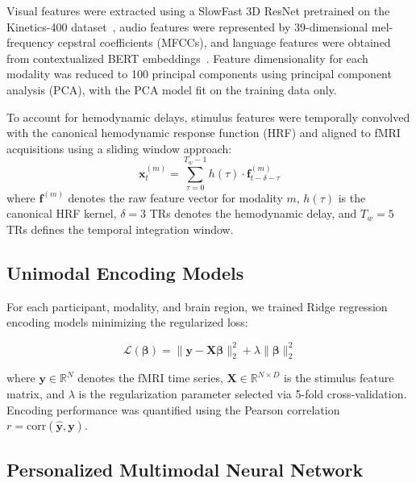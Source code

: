 \documentclass[10pt,letterpaper]{article}
\begin{document}
Visual features were extracted using a SlowFast 3D ResNet pretrained on the Kinetics-400 dataset~\citep{feichtenhofer2019slowfast}, audio features were represented by 39-dimensional mel-frequency cepstral coefficients (MFCCs), and language features were obtained from contextualized BERT embeddings~\citep{devlin2019bert}. Feature dimensionality for each modality was reduced to 100 principal components using principal component analysis (PCA), with the PCA model fit on the training data only.

To account for hemodynamic delays, stimulus features were temporally convolved with the canonical hemodynamic response function (HRF) and aligned to fMRI acquisitions using a sliding window approach:
\begin{equation}\label{eq:xt}
\mathbf{x}_t^{(m)} = \sum_{\tau=0}^{T_w-1} h(\tau) \cdot \mathbf{f}_{t-\delta-\tau}^{(m)}
\tag{1}
\end{equation}
where $\mathbf{f}^{(m)}$ denotes the raw feature vector for modality $m$, $h(\tau)$ is the canonical HRF kernel, $\delta = 3$ TRs denotes the hemodynamic delay, and $T_w = 5$ TRs defines the temporal integration window.



\subsection{Unimodal Encoding Models}

For each participant, modality, and brain region, we trained Ridge regression encoding models minimizing the regularized loss:

\begin{equation}\label{eq:L}
\mathcal{L}(\boldsymbol{\beta}) =
\lVert \mathbf{y} - \mathbf{X}\boldsymbol{\beta} \rVert_2^2
+ \lambda \lVert \boldsymbol{\beta} \rVert_2^2
\tag{2}
\end{equation}

where $\mathbf{y} \in \mathbb{R}^N$ denotes the fMRI time series,
$\mathbf{X} \in \mathbb{R}^{N \times D}$ is the stimulus feature matrix,
and $\lambda$ is the regularization parameter selected via 5-fold cross-validation.
Encoding performance was quantified using the Pearson correlation
$r = \mathrm{corr}(\hat{\mathbf{y}}, \mathbf{y})$.

\subsection{Personalized Multimodal Neural Network}
\end{document}

